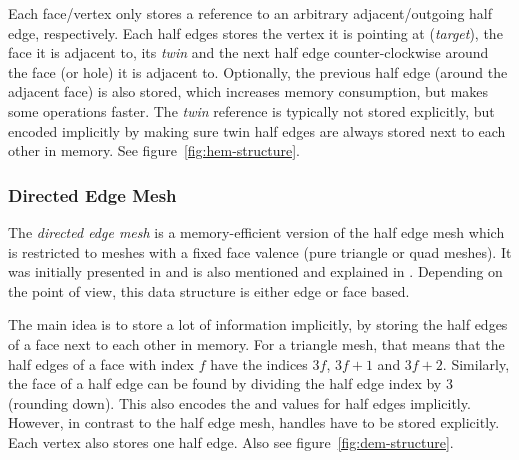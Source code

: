 Each face/vertex only stores a reference to an arbitrary adjacent/outgoing half edge, respectively.
Each half edges stores the vertex it is pointing at (\emph{target}), the face it is adjacent to, its \emph{twin} and the next half edge counter-clockwise around the face (or hole) it is adjacent to.
Optionally, the previous half edge (around the adjacent face) is also stored, which increases memory consumption, but makes some operations faster.
The \emph{twin} reference is typically not stored explicitly, but encoded implicitly by making sure twin half edges are always stored next to each other in memory.
See figure~\ref{fig:hem-structure}.


\subsubsection*{Directed Edge Mesh}

The \emph{directed edge mesh} is a memory-efficient version of the half edge mesh which is restricted to meshes with a fixed face valence (pure triangle or quad meshes).
It was initially presented in \cite{campagna1998directed} and is also mentioned and explained in \cite[Chapter~2]{botsch2010polygon}.
Depending on the point of view, this data structure is either edge or face based.

The main idea is to store a lot of information implicitly, by storing the half edges of a face next to each other in memory.
For a triangle mesh, that means that the half edges of a face with index $f$ have the indices $3f$, $3f + 1$ and $3f + 2$.
Similarly, the face of a half edge can be found by dividing the half edge index by 3 (rounding down).
This also encodes the  and  values for half edges implicitly.
However, in contrast to the half edge mesh,  handles have to be stored explicitly.
Each vertex also stores one  half edge.
Also see figure~\ref{fig:dem-structure}.

